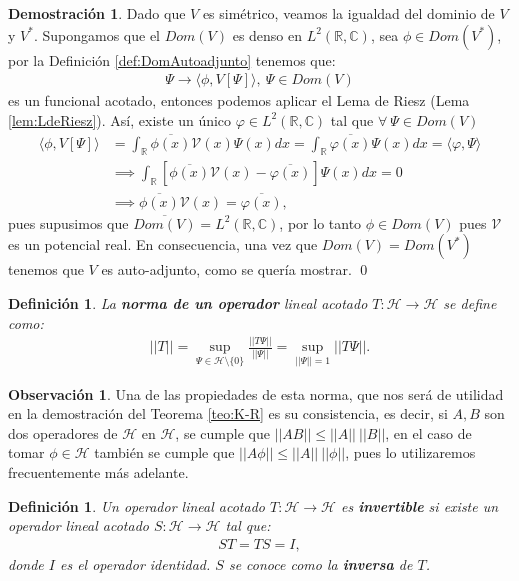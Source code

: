 \documentclass[12pt]{article}
\newtheorem{defn}[teo]{Definición}
\theoremstyle{definition}
\newtheorem*{demo}{Demostración}
\newtheorem{obs}{Observación}
\newcommand*{\field}[1]{\mathbb{#1}}
\begin{document}
\begin{demo}
    Dado que $V$ es simétrico, veamos la igualdad del dominio de $V$ y $V^{*}$. Supongamos que el $Dom(V)$ es denso en $L^{2}(\field{R},\field{C})$, sea $\phi \in Dom(V^*)$, por la Definición \ref{def:DomAutoadjunto} tenemos que:
    \begin{align*}
        \Psi \rightarrow \langle \phi, V[\Psi]\rangle,\: \Psi\in Dom(V)
    \end{align*}
    es un funcional acotado, entonces podemos aplicar el Lema de Riesz (Lema \ref{lem:LdeRiesz}). Así, existe un único $\varphi\in L^{2}(\field{R},\field{C})$ tal que $\forall\: \Psi \in Dom(V)$
    \begin{align*} \langle\phi,V[\Psi]\rangle & = \int_{\field{R}}\overline{\phi(x)}\mathcal{V}(x)\Psi(x) dx = \int_{\field{R}} \overline{\varphi(x)}\Psi(x) dx = \langle\varphi,\Psi\rangle
    \\ &
    \implies 
    \int_{\field{R}}[\overline{\phi(x)}\mathcal{V}(x)-\overline{\varphi(x)}]\Psi(x) dx = 0
    \\ &
    \implies
    \overline{\phi(x)}\mathcal{V}(x) = \overline{\varphi(x)},
    \end{align*}
    pues supusimos que $\overline{Dom(V)}=L^2(\field{R},\field{C})$, por lo tanto $\phi \in Dom(V)$ pues $\mathcal{V}$ es un potencial real. En consecuencia, una vez que $Dom(V) = Dom(V^*)$ tenemos que $V$ es auto-adjunto, como se quería mostrar.
    \qed
\end{demo}
\begin{defn}
    La \textbf{norma de un operador} lineal acotado $T:\mathcal{H}\longrightarrow\mathcal{H}$ se define como:
    \begin{align*}
        ||T|| = \sup_{\Psi\in\mathcal{H}\setminus \{0\}}\frac{||T\Psi||}{||\Psi||}= \sup_{||\Psi||=1}||T\Psi||.
    \end{align*}
\end{defn}
\begin{obs}
    Una de las propiedades de esta norma, que nos será de utilidad en la demostración del Teorema \ref{teo:K-R} es su consistencia, es decir, si $A,B$ son dos operadores de $\mathcal{H}$ en $\mathcal{H}$, se cumple que $||AB||\leq||A||\:||B||$, en el caso de tomar $\phi\in\mathcal{H}$ también se cumple que $||A\phi||\leq||A||\:||\phi||$, pues lo utilizaremos frecuentemente más adelante.
\end{obs}
\begin{defn}
    Un operador lineal acotado $T:\mathcal{H}\longrightarrow\mathcal{H}$ es \textbf{invertible} si existe un operador lineal acotado $S:\mathcal{H}\longrightarrow\mathcal{H}$ tal que:
    \begin{align*}
        ST=TS=I,
    \end{align*}
    donde $I$ es el operador identidad. $S$ se conoce como la \textbf{inversa} de $T$.
    \label{def:InvOperator}
\end{defn}
\end{document}
